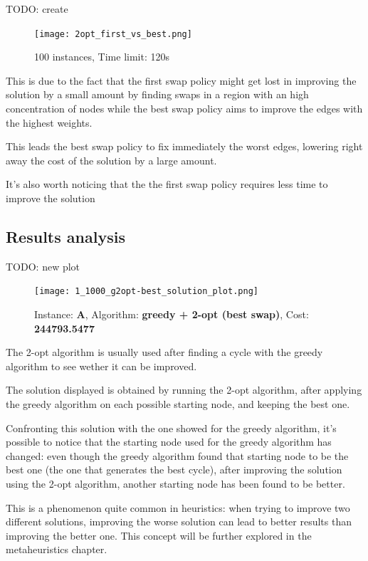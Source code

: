 TODO: create 

\begin{figure}[h]
    \centering
    \texttt{[image: 2opt\_first\_vs\_best.png]}
    \caption*{100 instances, Time limit: 120s}
\end{figure}

This is due to the fact that the first swap policy might get lost in improving the solution by a small amount by finding swaps in a region with an high concentration of nodes while the best swap policy aims to improve the edges with the highest weights.

This leads the best swap policy to fix immediately the worst edges, lowering right away the cost of the solution by a large amount.

It's also worth noticing that the the first swap policy requires less time to improve the solution
\newpage
\subsection{Results analysis}

TODO: new plot
\FloatBarrier
\begin{figure}[h]
    \centering
    \texttt{[image: 1\_1000\_g2opt-best\_solution\_plot.png]}
    \caption*{Instance: \textbf{A}, Algorithm: \textbf{greedy + 2-opt (best swap)}, Cost: \textbf{244793.5477}}
\end{figure}
\FloatBarrier

The 2-opt algorithm is usually used after finding a cycle with the greedy algorithm to see wether it can be improved.

The solution displayed is obtained by running the 2-opt algorithm, after applying the greedy algorithm on each possible starting node, and keeping the best one.

\newpage

Confronting this solution with the one showed for the greedy algorithm, it's possible to notice that the starting node used for the greedy algorithm has changed: even though the greedy algorithm found that starting node to be the best one (the one that generates the best cycle), after improving the solution using the 2-opt algorithm, another starting node has been found to be better.

This is a phenomenon quite common in heuristics: when trying to improve two different solutions, improving the worse solution can lead to better results than improving the better one. This concept will be further explored in the metaheuristics chapter.

